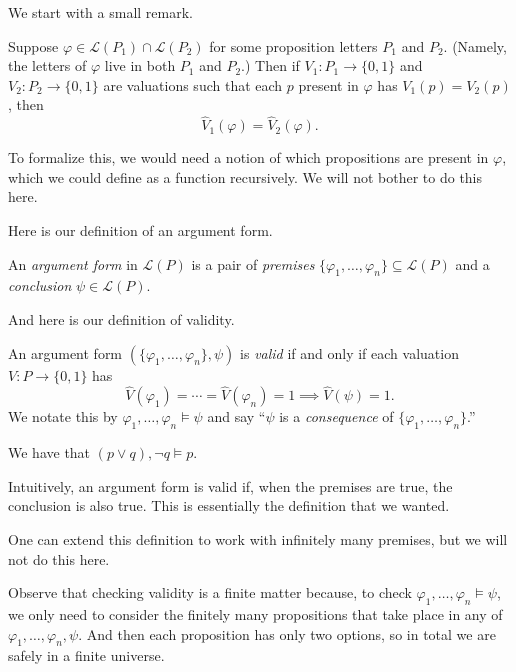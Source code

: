 \documentclass[../notes.tex]{subfiles}
\begin{document}
We start with a small remark.
\begin{remark}
	Suppose $\varphi\in\mathcal L(P_1)\cap\mathcal L(P_2)$ for some proposition letters $P_1$ and $P_2$. (Namely, the letters of $\varphi$ live in both $P_1$ and $P_2$.) Then if $V_1:P_1\to\{0,1\}$ and $V_2:P_2\to\{0,1\}$ are valuations such that each $p$ present in $\varphi$ has $V_1(p)=V_2(p)$, then
	\[\hat V_1(\varphi)=\hat V_2(\varphi).\]
\end{remark}
To formalize this, we would need a notion of which propositions are present in $\varphi$, which we could define as a function recursively. We will not bother to do this here.

Here is our definition of an argument form.
\begin{definition}
	An \textit{argument form} in $\mathcal L(P)$ is a pair of \textit{premises} $\{\varphi_1,\ldots,\varphi_n\}\subseteq\mathcal L(P)$ and a \textit{conclusion} $\psi\in\mathcal L(P)$.
\end{definition}
And here is our definition of validity.
\begin{definition}[Valid]
	An argument form $(\{\varphi_1,\ldots,\varphi_n\},\psi)$ is \textit{valid} if and only if each valuation $V:P\to\{0,1\}$ has
	\[\hat V(\varphi_1)=\cdots=\hat V(\varphi_n)=1\implies\hat V(\psi)=1.\]
	We notate this by $\varphi_1,\ldots,\varphi_n\models\psi$ and say ``$\psi$ is a \textit{consequence} of $\{\varphi_1,\ldots,\varphi_n\}$.''
\end{definition}
\begin{example}
	We have that $(p\lor q),\lnot q\models p$.
\end{example}
Intuitively, an argument form is valid if, when the premises are true, the conclusion is also true. This is essentially the definition that we wanted.
\begin{remark}
	One can extend this definition to work with infinitely many premises, but we will not do this here.
\end{remark}

Observe that checking validity is a finite matter because, to check $\varphi_1,\ldots,\varphi_n\models\psi$, we only need to consider the finitely many propositions that take place in any of $\varphi_1,\ldots,\varphi_n,\psi$. And then each proposition has only two options, so in total we are safely in a finite universe.
\end{document}
